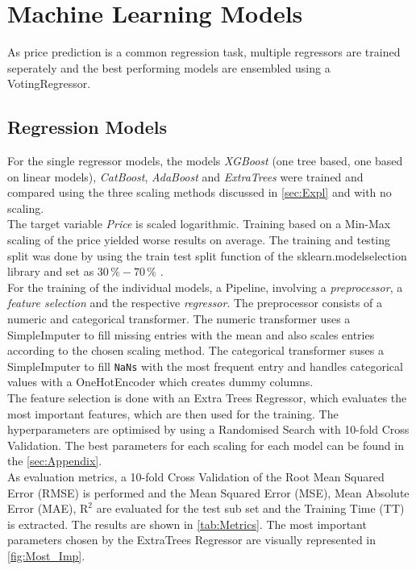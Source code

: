 \section{Machine Learning Models}
\label{sec:ML}

As price prediction is a common regression task, multiple regressors are trained seperately and the best performing 
models are ensembled using a VotingRegressor.

\subsection{Regression Models}

For the single regressor models, the models \textit{XGBoost} (one tree based, one based on linear models), \textit{CatBoost},
\textit{AdaBoost} and \textit{ExtraTrees} were trained and compared using the three scaling methods discussed in \autoref{sec:Expl}
and with no scaling.\\
The target variable \textit{Price} is scaled logarithmic. Training based on a Min-Max scaling of the price yielded worse results
on average. The training and testing split was done by using the train test split function of the sklearn.modelselection
library and set as $30 \, \% - 70 \, \%$ .\\
For the training of the individual models, a Pipeline, involving a \textit{preprocessor}, a \textit{feature selection} and the 
respective \textit{regressor}. The preprocessor consists of a numeric and categorical transformer. The numeric transformer uses 
a SimpleImputer to fill missing entries with the mean and also scales entries according to the chosen scaling method. The categorical
transformer suses a SimpleImputer to fill \texttt{NaNs} with the most frequent entry and handles categorical values
with a OneHotEncoder which creates dummy columns.\\
The feature selection is done with an Extra Trees Regressor, which evaluates the most important features, which are then used 
for the training. The hyperparameters are optimised by using a Randomised Search with 10-fold Cross Validation. The best parameters
for each scaling for each model can be found in the \autoref{sec:Appendix}.\\
As evaluation metrics, a 10-fold Cross Validation of the Root Mean Squared Error (RMSE) is performed and the Mean Squared Error (MSE),
Mean Absolute Error (MAE), $ \mathrm{R}^2 $ are evaluated for the test sub set and the Training Time (TT) is extracted. The results
are shown in \autoref{tab:Metrics}.
The most important parameters chosen by the ExtraTrees Regressor are visually represented in \autoref{fig:Most_Imp}.


